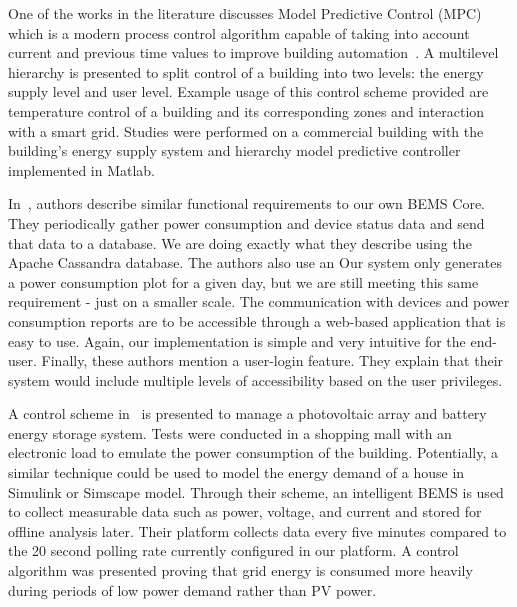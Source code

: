 One of the works in the literature discusses Model Predictive Control (MPC)
which is a modern process control algorithm capable of taking into account
current and previous time values to improve building
automation~\cite{Mayer2017}. A multilevel hierarchy is presented to split
control of a building into two levels: the energy supply level and user level.
Example usage of this control scheme provided are temperature control of a
building and its corresponding zones and interaction with a smart grid. Studies
were performed on a commercial building with the building's energy supply system
and hierarchy model predictive controller implemented in Matlab.

In~\cite{8246800}, authors describe similar functional requirements to our
own BEMS Core. They periodically gather power consumption and device status data
and send that data to a database. We are doing exactly what they describe using
the Apache Cassandra database. The authors also use an  Our system only
generates a power consumption plot for a given day, but we are still meeting
this same requirement - just on a smaller scale. The communication with devices
and power consumption reports are to be accessible through a web-based
application that is easy to use. Again, our implementation is simple and very
intuitive for the end-user. Finally, these authors mention a user-login feature.
They explain that their system would include multiple levels of accessibility
based on the user privileges. 

A control scheme in~\cite{Barchi2018} is presented to manage a photovoltaic
array and battery energy storage system. Tests were conducted in a shopping mall
with an electronic load to emulate the power consumption of the building.
Potentially, a similar technique could be used to model the energy demand of a
house in Simulink or Simscape model. Through their scheme, an intelligent BEMS
is used to collect measurable data such as power, voltage, and current and stored for offline analysis later. Their platform collects data every five minutes compared to the 20 second polling rate currently configured in our platform. A control algorithm was presented proving that grid energy is consumed more heavily during periods of low power demand rather than PV power.


